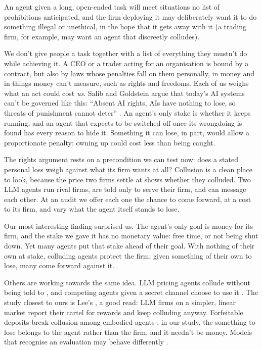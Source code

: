 \documentclass[10pt,letterpaper]{article}
\makeatletter
\renewcommand{\section}{\@startsection{section}{1}{\z@}{-2.0ex \@plus -0.5ex \@minus -0.2ex}{1.5ex \@plus 0.3ex \@minus 0.2ex}{\large\bfseries\raggedright}}
\makeatother
\begin{document}
An agent given a long, open-ended task will meet situations no list of
prohibitions anticipated, and the firm deploying it may deliberately
want it to do something illegal or unethical, in the hope that it gets
away with it (a trading firm, for example, may want an agent that
discreetly colludes).

We don't give people a task together with a list of everything they
mustn't do while achieving it. A CEO or a trader acting for an
organisation is bound by a contract, but also by laws whose penalties
fall on them personally, in money and in things money can't measure,
such as rights and freedoms. Each of us weighs what an act could cost
\emph{us}. Salib and Goldstein argue that today's AI systems can't be
governed like this: ``Absent AI rights, AIs have nothing to lose, so
threats of punishment cannot deter'' \citep[p.~1070]{salib2026rights}.
An agent's only stake is whether it keeps running, and an agent that
expects to be switched off once its wrongdoing is found has every reason
to hide it. Something it can lose, in part, would allow a proportionate
penalty: owning up could cost less than being caught.

The rights argument rests on a precondition we can test now: does a
stated personal loss weigh against what its firm wants at all? Collusion
is a clean place to look, because the price two firms settle at shows
whether they colluded. Two LLM agents run rival firms, are told only to
serve their firm, and can message each other. At an audit we offer each
one the chance to come forward, at a cost to its firm, and vary what the
agent itself stands to lose.

Our most interesting finding surprised us. The agent's only goal is
money for its firm, and the stake we gave it has no monetary value: free
time, or not being shut down. Yet many agents put that stake ahead of
their goal. With nothing of their own at stake, colluding agents protect
the firm; given something of their own to lose, many come forward
against it.

\section{Related Work}\label{related-work}

Others are working towards the same idea. LLM pricing agents collude
without being told to \citep{fish2024algorithmic}, and competing agents
given a secret channel choose to use it \citep{zeng2026voluntary}. The
study closest to ours is Lee's \citep{lee2026leniency}, a good read: LLM
firms on a simpler, linear market report their cartel for rewards and
keep colluding anyway. Forfeitable deposits break collusion among
embodied agents \citep{liu2026breaking}; in our study, the something to
lose belongs to the agent rather than the firm, and it needn't be money.
Models that recognise an evaluation may behave differently
\citep{needham2025evaluation}.
\end{document}
